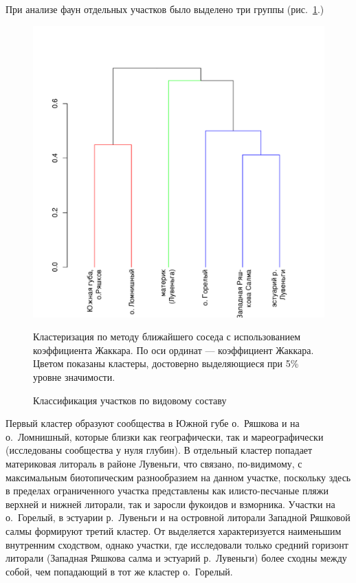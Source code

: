 При анализе фаун отдельных участков было выделено три группы (рис.~\ref{ris:cluster_white_species_sites}.) 
	\begin{figure}
		\begin{center}
			\includegraphics{../White_Sea/soobshestvo/White_fauna_sites_jaccard_single_1.pdf}
		\end{center}
	\caption{Классификация участков по видовому составу}
	\label{ris:cluster_white_species_sites}

	\footnotesize{Кластеризация по методу ближайшего соседа с использованием коэффициента Жаккара. По оси ординат --- коэффициент Жаккара. Цветом показаны кластеры, достоверно выделяющиеся при 5\% уровне значимости.}
	\end{figure}
Первый кластер образуют сообщества в  Южной губе о.~Ряшкова и на о.~Ломнишный, которые близки как географически, так и мареографически (исследованы сообщества у нуля глубин).
В отдельный кластер попадает материковая литораль в районе Лувеньги, что связано, по-видимому, с максимальным биотопическим разнообразием на данном участке, поскольку здесь в пределах ограниченного участка представлены как илисто-песчаные пляжи верхней и нижней литорали, так и заросли фукоидов и взморника.
Участки на о.~Горелый, в эстуарии р.~Лувеньги и на островной литорали Западной Ряшковой салмы формируют третий кластер.
От выделяется характеризуется наименьшим внутренним сходством, однако участки, где исследовали только средний горизонт литорали (Западная Ряшкова салма и эстуарий р.~Лувеньги) более сходны между собой, чем попадающий в тот же кластер о.~Горелый.

